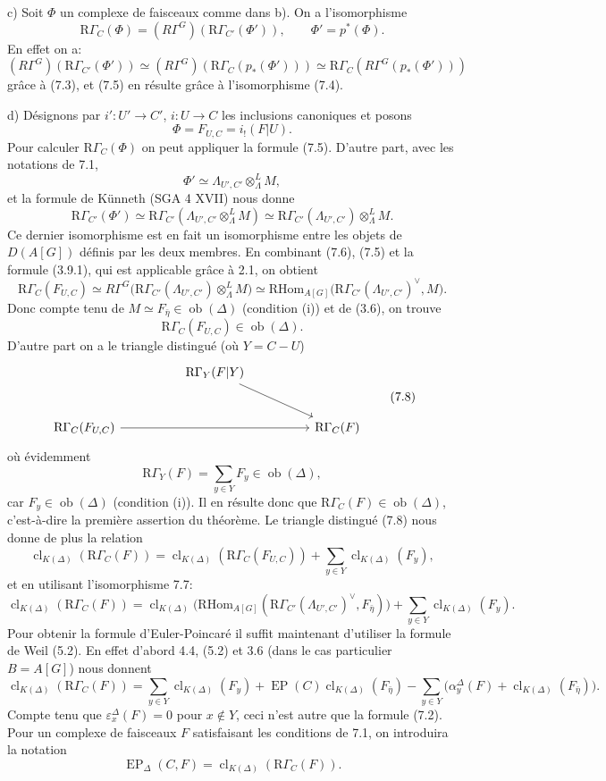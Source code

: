 \documentclass[11pt]{article}
\providecommand{\RHom}{\mathrm{RHom}}
\providecommand{\EP}{\operatorname{EP}}
\providecommand{\Ob}{\operatorname{ob}}
\providecommand{\RHom}{\mathrm{RHom}}
\providecommand{\RHom}{\mathrm R\mathcal{H}om}
\providecommand{\Ob}{\operatorname{ob}}
\providecommand{\EP}{\operatorname{EP}}
\providecommand{\Ob}{\operatorname{Ob}}
\providecommand{\clK}[1]{\operatorname{cl}_{K(#1)}}
\providecommand{\RG}{\mathrm R\Gamma}
\providecommand{\RHom}{\mathrm{RHom}}
\begin{document}
c) Soit $\Phi$ un complexe de faisceaux comme dans b). On a l'isomorphisme
\[
\RG_C(\Phi)=(R\Gamma^G)(\RG_{C'}(\Phi')),
\qquad \Phi'=p^*(\Phi).
\tag{7.5}
\]
En effet on a:
\[
(R\Gamma^G)(\RG_{C'}(\Phi'))
\simeq
(R\Gamma^G)(\RG_C(p_*(\Phi')))
\simeq
\RG_C(R\Gamma^G(p_*(\Phi')))
\]
grâce à (7.3), et (7.5) en résulte grâce à l'isomorphisme (7.4).

d) Désignons par $i':U'\to C'$, $i:U\to C$ les inclusions canoniques et posons
\[
\Phi=F_{U,C}=i_!(F|U).
\]
Pour calculer $\RG_C(\Phi)$ on peut appliquer la formule (7.5). D'autre part, avec les notations de 7.1,
\[
\Phi'\simeq \Lambda_{U',C'}\otimes_\Lambda^L M,
\]
et la formule de Künneth (SGA 4 XVII) nous donne
\[
\RG_{C'}(\Phi')
\simeq
\RG_{C'}(\Lambda_{U',C'}\otimes_\Lambda^L M)
\simeq
\RG_{C'}(\Lambda_{U',C'})\otimes_\Lambda^L M.
\tag{7.6}
\]
Ce dernier isomorphisme est en fait un isomorphisme entre les objets de $D(A[G])$ définis par les deux membres. En combinant (7.6), (7.5) et la formule (3.9.1), qui est applicable grâce à 2.1, on obtient
\[
\RG_C(F_{U,C})
\simeq
R\Gamma^G\bigl(\RG_{C'}(\Lambda_{U',C'})\otimes_\Lambda^L M\bigr)
\simeq
\RHom_{A[G]}\bigl(\RG_{C'}(\Lambda_{U',C'})^\vee,M\bigr).
\tag{7.7}
\]
Donc compte tenu de $M\simeq F_{\bar\eta}\in\Ob(\Delta)$ (condition (i)) et de (3.6), on trouve
\[
\RG_C(F_{U,C})\in\Ob(\Delta).
\]
D'autre part on a le triangle distingué (où $Y=C-U$)
\[
\begin{tikzcd}[column sep=huge,row sep=large]
& \RG_Y(F|Y) \arrow[dr] & \\
\RG_C(F_{U,C}) \arrow[rr] && \RG_C(F)
\end{tikzcd}
\tag{7.8}
\]
où évidemment
\[
\RG_Y(F)=\sum_{y\in Y}F_y\in\Ob(\Delta),
\]
car $F_y\in\Ob(\Delta)$ (condition (i)). Il en résulte donc que $\RG_C(F)\in\Ob(\Delta)$, c'est-à-dire la première assertion du théorème. Le triangle distingué (7.8) nous donne de plus la relation
\[
\clK{\Delta}(\RG_C(F))
=
\clK{\Delta}(\RG_C(F_{U,C}))
+\sum_{y\in Y}\clK{\Delta}(F_y),
\]
et en utilisant l'isomorphisme 7.7:
\[
\clK{\Delta}(\RG_C(F))
=
\clK{\Delta}\bigl(\RHom_{A[G]}(\RG_{C'}(\Lambda_{U',C'})^\vee,F_{\bar\eta})\bigr)
+\sum_{y\in Y}\clK{\Delta}(F_y).
\]
Pour obtenir la formule d'Euler-Poincaré il suffit maintenant d'utiliser la formule de Weil (5.2). En effet d'abord 4.4, (5.2) et 3.6 (dans le cas particulier $B=A[G]$) nous donnent
\[
\clK{\Delta}(\RG_C(F))
=
\sum_{y\in Y}\clK{\Delta}(F_y)
+\EP(C)\clK{\Delta}(F_{\bar\eta})
-\sum_{y\in Y}\bigl(\alpha_y^\Delta(F)+\clK{\Delta}(F_{\bar\eta})\bigr).
\]
Compte tenu que $\varepsilon_x^\Delta(F)=0$ pour $x\notin Y$, ceci n'est autre que la formule (7.2). Pour un complexe de faisceaux $F$ satisfaisant les conditions de 7.1, on introduira la notation
\[
\EP_\Delta(C,F)=\clK{\Delta}(\RG_C(F)).
\]
\end{document}
